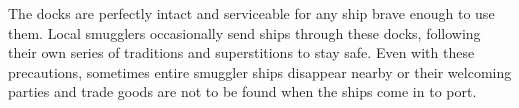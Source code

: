 The docks are perfectly intact and serviceable for any ship brave enough to use them.
Local smugglers occasionally send ships through these docks, following their own series of traditions and superstitions to stay safe.
Even with these precautions, sometimes entire smuggler ships disappear nearby or their welcoming parties and trade goods are not to be found when the ships come in to port.
